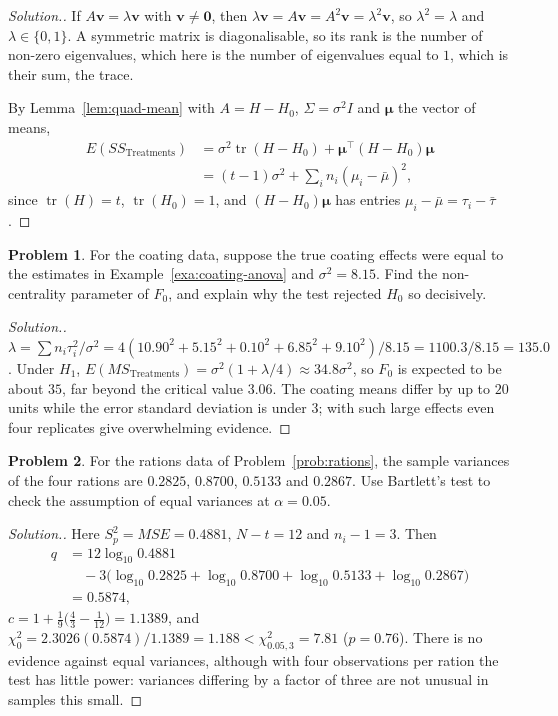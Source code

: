 \documentclass[11pt,a4paper]{article}
\numberwithin{equation}{section}
\theoremstyle{definition}
\newtheorem{problemx}{Problem}[subsection]
\newenvironment{problem}{\begin{problemx}}{\end{problemx}}
\newenvironment{solution}
  {\renewcommand{\qedsymbol}{}\begin{proof}[\textit{Solution}.]}
  {\end{proof}}
\begin{document}
\begin{solution}
If $A\mathbf v = \lambda\mathbf v$ with $\mathbf v \ne \mathbf 0$, then $\lambda\mathbf v = A\mathbf v = A^2\mathbf v = \lambda^2\mathbf v$, so $\lambda^2 = \lambda$ and $\lambda \in \{0, 1\}$. A symmetric matrix is
diagonalisable, so its rank is the number of non-zero eigenvalues, which here is the number of eigenvalues equal to $1$, which is their sum, the
trace.

By Lemma~\ref{lem:quad-mean} with $A = H - H_0$, $\Sigma = \sigma^2I$ and $\boldsymbol\mu$ the vector of means,
\begin{align*}
E(SS_{\mathrm{Treatments}}) &= \sigma^2\operatorname{tr}(H - H_0) + \boldsymbol\mu^\top(H - H_0)\boldsymbol\mu \\
&= (t - 1)\sigma^2 + \sum_in_i(\mu_i - \bar\mu)^2 ,
\end{align*}
since $\operatorname{tr}(H) = t$, $\operatorname{tr}(H_0) = 1$, and $(H - H_0)\boldsymbol\mu$ has entries $\mu_i - \bar\mu = \tau_i - \bar\tau$.
\end{solution}

\begin{problem}
For the coating data, suppose the true coating effects were equal to the estimates in Example~\ref{exa:coating-anova} and $\sigma^2 = 8.15$. Find the
non-centrality parameter of $F_0$, and explain why the test rejected $H_0$ so decisively.
\end{problem}

\begin{solution}
$\lambda = \sum n_i\tau_i^2/\sigma^2 = 4(10.90^2 + 5.15^2 + 0.10^2 + 6.85^2 + 9.10^2)/8.15 = 1100.3/8.15 = 135.0$. Under $H_1$, $E(MS_{\mathrm{Treatments}}) = \sigma^2(1 + \lambda/4) \approx 34.8\sigma^2$,
so $F_0$ is expected to be about $35$, far beyond the critical value $3.06$. The coating means differ by up to $20$ units while the error standard
deviation is under $3$; with such large effects even four replicates give overwhelming evidence.
\end{solution}

\begin{problem}
For the rations data of Problem~\ref{prob:rations}, the sample variances of the four rations are $0.2825$, $0.8700$, $0.5133$ and $0.2867$. Use Bartlett's test to check
the assumption of equal variances at $\alpha = 0.05$.
\end{problem}

\begin{solution}
Here $S_p^2 = MSE = 0.4881$, $N - t = 12$ and $n_i - 1 = 3$. Then
\begin{align*}
q &= 12\log_{10}0.4881 \\
&\quad - 3\bigl(\log_{10}0.2825 + \log_{10}0.8700 + \log_{10}0.5133 + \log_{10}0.2867\bigr) \\
&= 0.5874 ,
\end{align*}
$c = 1 + \frac19\bigl(\frac43 - \frac{1}{12}\bigr) = 1.1389$, and $\chi_0^2 = 2.3026(0.5874)/1.1389 = 1.188 < \chi^2_{0.05,3} = 7.81$ ($p = 0.76$). There is no evidence against
equal variances, although with four observations per ration the test has little power: variances differing by a factor of three are not unusual in
samples this small.
\end{solution}
\end{document}
